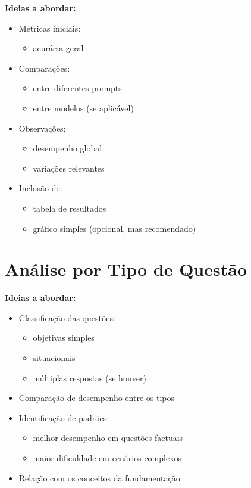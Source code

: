 \textbf{Ideias a abordar:}
\begin{itemize}
    \item Métricas iniciais:
    \begin{itemize}
        \item acurácia geral
    \end{itemize}
    \item Comparações:
    \begin{itemize}
        \item entre diferentes prompts
        \item entre modelos (se aplicável)
    \end{itemize}
    \item Observações:
    \begin{itemize}
        \item desempenho global
        \item variações relevantes
    \end{itemize}
    \item Inclusão de:
    \begin{itemize}
        \item tabela de resultados
        \item gráfico simples (opcional, mas recomendado)
    \end{itemize}
\end{itemize}

\section{Análise por Tipo de Questão}
\label{subsec:tipo_questao}

\textbf{Ideias a abordar:}
\begin{itemize}
    \item Classificação das questões:
    \begin{itemize}
        \item objetivas simples
        \item situacionais
        \item múltiplas respostas (se houver)
    \end{itemize}
    \item Comparação de desempenho entre os tipos
    \item Identificação de padrões:
    \begin{itemize}
        \item melhor desempenho em questões factuais
        \item maior dificuldade em cenários complexos
    \end{itemize}
    \item Relação com os conceitos da fundamentação
\end{itemize}

